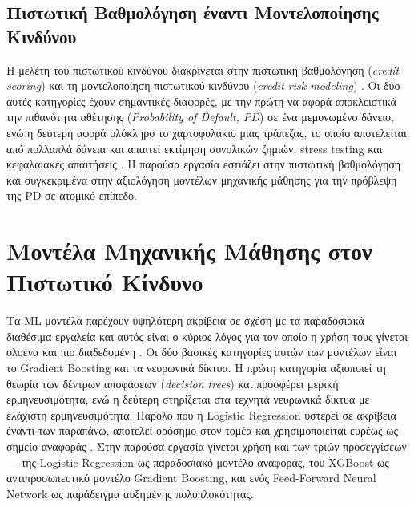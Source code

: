 \subsection{Πιστωτική Βαθμολόγηση έναντι Μοντελοποίησης Κινδύνου}
\label{subsec:scoring_vs_modeling}
Η μελέτη του πιστωτικού κινδύνου διακρίνεται στην πιστωτική 
βαθμολόγηση (\textit{credit scoring}) και τη μοντελοποίηση 
πιστωτικού κινδύνου (\textit{credit risk modeling}) \citep{thomas2000}. 
Οι δύο αυτές κατηγορίες έχουν σημαντικές διαφορές, με την πρώτη να 
αφορά αποκλειστικά την πιθανότητα αθέτησης (\textit{Probability of 
Default, PD}) σε ένα μεμονωμένο δάνειο, ενώ η δεύτερη αφορά 
ολόκληρο το χαρτοφυλάκιο μιας τράπεζας, το οποίο αποτελείται από 
πολλαπλά δάνεια και απαιτεί εκτίμηση συνολικών ζημιών, stress testing 
και κεφαλαιακές απαιτήσεις \citep{mcneil2015}. Η παρούσα εργασία 
εστιάζει στην πιστωτική βαθμολόγηση και συγκεκριμένα στην αξιολόγηση 
μοντέλων μηχανικής μάθησης για την πρόβλεψη της PD σε ατομικό επίπεδο.

\section{Μοντέλα Μηχανικής Μάθησης στον Πιστωτικό Κίνδυνο}
\label{sec:ml_models}

Τα ML μοντέλα παρέχουν υψηλότερη ακρίβεια σε σχέση με τα παραδοσιακά 
διαθέσιμα εργαλεία και αυτός είναι ο κύριος λόγος για τον οποίο η 
χρήση τους γίνεται ολοένα και πιο διαδεδομένη \citep{hastie2009}. 
Οι δύο βασικές κατηγορίες αυτών των μοντέλων είναι το Gradient 
Boosting και τα νευρωνικά δίκτυα. Η πρώτη κατηγορία αξιοποιεί τη 
θεωρία των δέντρων αποφάσεων (\textit{decision trees}) και προσφέρει 
μερική ερμηνευσιμότητα, ενώ η δεύτερη στηρίζεται στα τεχνητά 
νευρωνικά δίκτυα με ελάχιστη ερμηνευσιμότητα. Παρόλο που η Logistic 
Regression υστερεί σε ακρίβεια έναντι των παραπάνω, αποτελεί ορόσημο 
στον τομέα και χρησιμοποιείται ευρέως ως σημείο αναφοράς 
\citep{siddiqi2006, lessmann2015benchmarking, hand1997statistical}.
 Στην παρούσα εργασία γίνεται χρήση και των τριών 
προσεγγίσεων --- της Logistic Regression ως παραδοσιακό μοντέλο 
αναφοράς, του XGBoost ως αντιπροσωπευτικό μοντέλο Gradient Boosting, 
και ενός Feed-Forward Neural Network ως παράδειγμα αυξημένης 
πολυπλοκότητας.

